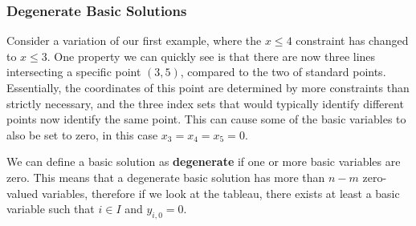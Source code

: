 \documentclass[a4paper, 12pt]{article}
\begin{document}
            \subsubsection*{Degenerate Basic Solutions}
                Consider a variation of our first example, where the $x \leq 4$ constraint has changed to $x \leq 3$.
                One property we can quickly see is that there are now three lines intersecting a specific point $(3, 5)$, compared to the two of standard points.
                Essentially, the coordinates of this point are determined by more constraints than strictly necessary, and the three index sets that would typically identify different points now identify the same point.
                This can cause some of the basic variables to also be set to zero, in this case $x_3 = x_4 = x_5 = 0$.
                \begin{center}
                \end{center}
                We can define a basic solution as \textbf{degenerate} if one or more basic variables are zero.
                This means that a degenerate basic solution has more than $n - m$ zero-valued variables, therefore if we look at the tableau, there exists at least a basic variable such that $i \in I$ and $y_{i, 0} = 0$.
                \medskip
\end{document}
